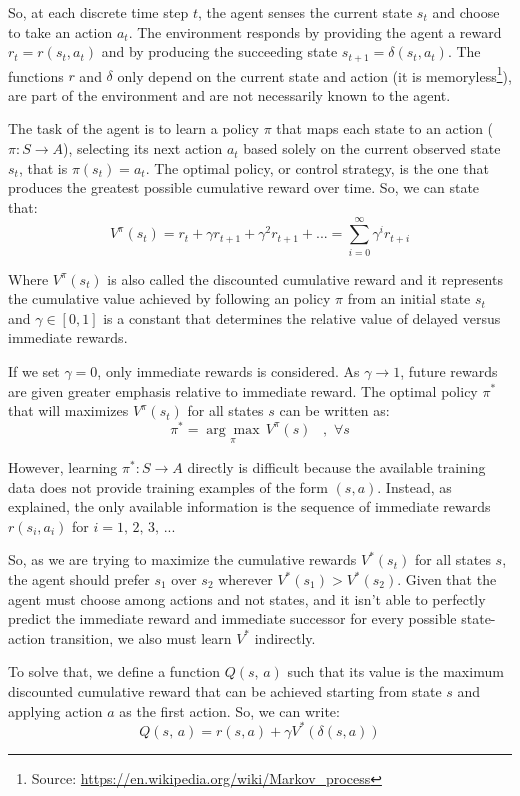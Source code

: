 \documentclass[a4paper]{article}
\begin{document}
So, at each discrete time step $t$, the agent senses the current state $s_t$ and choose to take an action $a_t$. The environment responds by providing the agent a reward $r_t=r(s_t, a_t)$ and by producing the succeeding state $s_{t+1}=\delta(s_t, a_t)$. The functions $r$ and $\delta$ only depend on the current state and action (it is memoryless\footnote{Source: \url{https://en.wikipedia.org/wiki/Markov_process}}), are part of the environment and are not necessarily known to the agent.

The task of the agent is to learn a policy $\pi$ that maps each state to an action ($\pi: S \rightarrow A$), selecting its next action $a_t$ based solely on the current observed state $s_t$, that is $\pi(s_t)=a_t$. The optimal policy, or control strategy, is the one that produces the greatest possible cumulative reward over time. So, we can state that:
$$V^{\pi}(s_t)= r_t + \gamma r_{t+1} + \gamma^2 r_{t+1} + ... = \sum_{i=0}^{\infty} \gamma^{i} r_{t+i}$$

Where $V^{\pi}(s_t)$ is also called the discounted cumulative reward and it represents the cumulative value achieved by following an policy $\pi$ from an initial state $s_t$ and $\gamma \in [0, 1]$ is a constant that determines the relative value of delayed versus immediate rewards.

If we set $\gamma=0$, only immediate rewards is considered. As $\gamma \rightarrow 1$, future rewards are given greater emphasis relative to immediate reward. The optimal policy $\pi^{*}$ that will maximizes $V^{\pi}(s_t)$ for all states $s$ can be written as:
$$\pi^{*} = \underset{\pi}{\arg \max} \, V^{\pi} (s)\,\,\,\,\,, \,\, \forall s$$

However, learning $\pi^{*}: S \rightarrow A$ directly is difficult because the available training data does not provide training examples of the form $(s, a)$. Instead, as \cite{Mitchell} explained, the only available information is the sequence of immediate rewards $r(s_i, a_i)$ for $i=1,\, 2,\, 3,\,...$

So, as we are trying to maximize the cumulative rewards $V^{*}(s_t)$ for all states $s$, the agent should prefer $s_1$ over $s_2$ wherever $V^{*}(s_1) > V^{*}(s_2)$. Given that the agent must choose among actions and not states, and it isn't able to perfectly predict the immediate reward and immediate successor for every possible state-action transition, we also must learn $V^{*}$ indirectly.

To solve that, we define a function $Q(s, \, a)$ such that its value is the maximum discounted cumulative reward that can be achieved starting from state $s$ and applying action $a$ as the first action. So, we can write:
$$Q(s, \, a) = r(s, a) + \gamma V^{*}(\delta(s, a))$$
\end{document}
